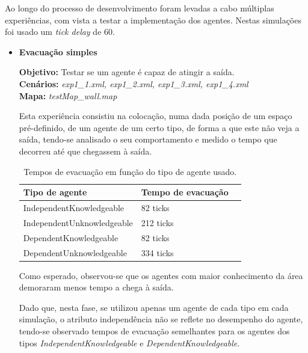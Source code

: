 \documentclass[12pt]{article}
\begin{document}
\begin{titlepage}
Ao longo do processo de desenvolvimento foram levadas a cabo múltiplas experiências, com vista a testar a implementação dos agentes. Nestas simulações foi usado um \textit{tick delay} de 60. 
\begin{itemize}
	
	
\item \textbf{Evacuação simples}

\textbf{Objetivo:} 
                                                                                                                                  	Testar se um agente é capaz de atingir a saída.
\\\textbf{Cenários:} 
\textit{exp1\_1.xml, exp1\_2.xml, exp1\_3.xml, exp1\_4.xml}
\\\textbf{Mapa:} 
\textit{testMap\_wall.map}
	
Esta experiência consistiu na colocação, numa dada posição de um espaço pré-definido, de um agente de um certo tipo, de forma a que este não veja a saída, tendo-se analisado o seu comportamento e medido o tempo que decorreu até que chegassem à saída.

	
\setlength{\tabcolsep}{20pt}
\renewcommand{\arraystretch}{1.3}
\begin{table}[H]
	\centering
	\caption{Tempos de evacuação em função do tipo de agente usado.}
	\begin{tabular}{@{}lll@{}}
		\toprule
		\rowcolor[HTML]{FFFFFF} 
		\textbf{Tipo de agente}  & \textbf{Tempo de evacuação}\\
		\toprule
		\rowcolor[HTML]{FFFFFF} 
		IndependentKnowledgeable & 82 ticks \\ \midrule 
		\rowcolor[HTML]{FFFFFF} 
		IndependentUnknowledgeable & 212 ticks \\ \midrule 
		DependentKnowledgeable & 82 ticks \\ \midrule 
		DependentUnknowledgeable &
		334 ticks \\ \midrule 
	\end{tabular}
\end{table}
	
	Como esperado, observou-se que os agentes com maior conhecimento da área demoraram menos tempo a chega à saída.
	
	Dado que, nesta fase, se utilizou apenas um agente de cada tipo em cada simulação, o atributo independência não se reflete no desempenho do agente, tendo-se observado tempos de evacuação semelhantes para os agentes dos tipos \textit{IndependentKnowledgeable} e \textit{DependentKnowledgeable}. 
	

\end{itemize}
\end{titlepage}
\end{document}

